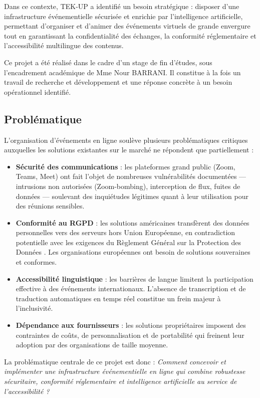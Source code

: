 Dans ce contexte, TEK-UP a identifié un besoin stratégique : disposer d'une infrastructure événementielle sécurisée et enrichie par l'intelligence artificielle, permettant d'organiser et d'animer des événements virtuels de grande envergure tout en garantissant la confidentialité des échanges, la conformité réglementaire et l'accessibilité multilingue des contenus.

Ce projet a été réalisé dans le cadre d'un stage de fin d'études, sous l'encadrement académique de Mme Nour BARRANI. Il constitue à la fois un travail de recherche et développement et une réponse concrète à un besoin opérationnel identifié.

\subsection{Problématique}
L'organisation d'événements en ligne soulève plusieurs problématiques critiques auxquelles les solutions existantes sur le marché ne répondent que partiellement :
\begin{itemize}
    \item \textbf{Sécurité des communications} : les plateformes grand public (Zoom, Teams, Meet) ont fait l'objet de nombreuses vulnérabilités documentées — intrusions non autorisées (Zoom-bombing), interception de flux, fuites de données — soulevant des inquiétudes légitimes quant à leur utilisation pour des réunions sensibles.
    \item \textbf{Conformité au RGPD} : les solutions américaines transfèrent des données personnelles vers des serveurs hors Union Européenne, en contradiction potentielle avec les exigences du Règlement Général sur la Protection des Données \cite{rgpd}. Les organisations européennes ont besoin de solutions souveraines et conformes.
    \item \textbf{Accessibilité linguistique} : les barrières de langue limitent la participation effective à des événements internationaux. L'absence de transcription et de traduction automatiques en temps réel constitue un frein majeur à l'inclusivité.
    \item \textbf{Dépendance aux fournisseurs} : les solutions propriétaires imposent des contraintes de coûts, de personnalisation et de portabilité qui freinent leur adoption par des organisations de taille moyenne.
\end{itemize}

La problématique centrale de ce projet est donc : \textit{Comment concevoir et implémenter une infrastructure événementielle en ligne qui combine robustesse sécuritaire, conformité réglementaire et intelligence artificielle au service de l'accessibilité ?}


